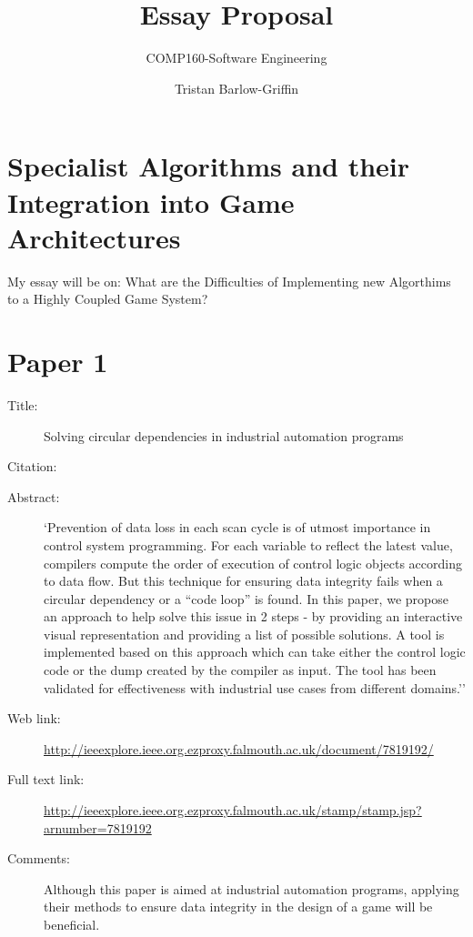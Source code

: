\documentclass{scrartcl}
\title{Essay Proposal}
\subtitle{COMP160-Software Engineering}
\author{Tristan Barlow-Griffin}
\begin{document}
\maketitle

\section*{Specialist Algorithms and their Integration into Game Architectures}

My essay will be on: What are the Difficulties of Implementing new Algorthims to a Highly Coupled Game System?




\section*{Paper 1}
\begin{description}
\item[Title:] Solving circular dependencies in industrial automation programs
\item[Citation:] \cite{nair2016solving}
\item[Abstract:] `Prevention of data loss in each scan cycle is of utmost importance in control system programming. For each variable to reflect the latest value, compilers compute the order of execution of control logic objects according to data flow. But this technique for ensuring data integrity fails when a circular dependency or a “code loop” is found. In this paper, we propose an approach to help solve this issue in 2 steps - by providing an interactive visual representation and providing a list of possible solutions. A tool is implemented based on this approach which can take either the control logic code or the dump created by the compiler as input. The tool has been validated for effectiveness with industrial use cases from different domains.''
\item[Web link:] \url{http://ieeexplore.ieee.org.ezproxy.falmouth.ac.uk/document/7819192/}
\item[Full text link:] \url{http://ieeexplore.ieee.org.ezproxy.falmouth.ac.uk/stamp/stamp.jsp?arnumber=7819192}
\item[Comments:] Although this paper is aimed at industrial automation programs, applying their methods to ensure data integrity in the design of a game will be beneficial.
\end{description}
\end{document}
